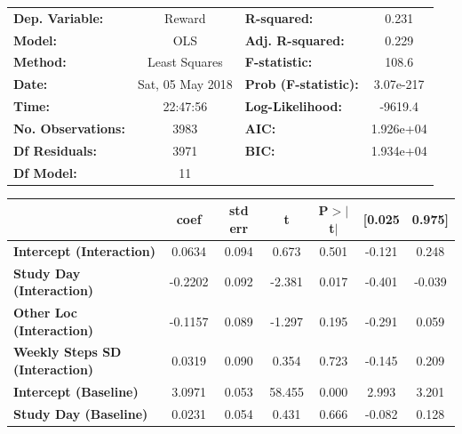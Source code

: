 \begin{table}
\begin{tabular}{lclc}
\toprule
\textbf{Dep. Variable:}                &      Reward       & \textbf{  R-squared:         } &     0.231   \\
\textbf{Model:}                        &       OLS        & \textbf{  Adj. R-squared:    } &     0.229   \\
\textbf{Method:}                       &  Least Squares   & \textbf{  F-statistic:       } &     108.6   \\
\textbf{Date:}                         & Sat, 05 May 2018 & \textbf{  Prob (F-statistic):} & 3.07e-217   \\
\textbf{Time:}                         &     22:47:56     & \textbf{  Log-Likelihood:    } &   -9619.4   \\
\textbf{No. Observations:}             &        3983      & \textbf{  AIC:               } & 1.926e+04   \\
\textbf{Df Residuals:}                 &        3971      & \textbf{  BIC:               } & 1.934e+04   \\
\textbf{Df Model:}                     &          11      & \textbf{                     } &             \\
\bottomrule
\end{tabular}
\begin{tabular}{lcccccc}
                                       & \textbf{coef} & \textbf{std err} & \textbf{t} & \textbf{P$>$$|$t$|$} & \textbf{[0.025} & \textbf{0.975]}  \\
\midrule
\textbf{Intercept (Interaction)}       &       0.0634  &        0.094     &     0.673  &         0.501        &       -0.121    &        0.248     \\
\textbf{Study Day (Interaction)}       &      -0.2202  &        0.092     &    -2.381  &         0.017        &       -0.401    &       -0.039     \\
\textbf{Other Loc (Interaction)}       &      -0.1157  &        0.089     &    -1.297  &         0.195        &       -0.291    &        0.059     \\
\textbf{Weekly Steps SD (Interaction)} &       0.0319  &        0.090     &     0.354  &         0.723        &       -0.145    &        0.209     \\
\textbf{Intercept (Baseline)}          &       3.0971  &        0.053     &    58.455  &         0.000        &        2.993    &        3.201     \\
\textbf{Study Day (Baseline)}          &       0.0231  &        0.054     &     0.431  &         0.666        &       -0.082    &        0.128     \\

\end{tabular}
\end{table}
